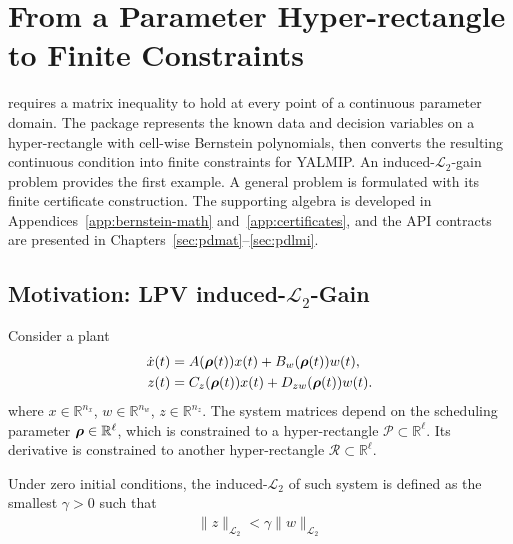 \chapter[From a Parameter Hyper-rectangle to Finite Constraints]{From a Parameter Hyper-rectangle to Finite Constraints}
\label{sec:bernstein-motivation}

 requires a matrix inequality to hold at every point of a continuous parameter domain. The package represents the known data and decision variables on a hyper-rectangle with cell-wise Bernstein polynomials, then converts the resulting continuous condition into finite constraints for YALMIP. An  induced-$\mathcal{L}_2$-gain problem provides the first example. A general  problem is formulated with its finite certificate construction. The supporting algebra is developed in Appendices~\ref{app:bernstein-math} and~\ref{app:certificates}, and the API contracts are presented in Chapters~\ref{sec:pdmat}--\ref{sec:pdlmi}.

\section[LPV Induced-L2-Gain Motivation]{Motivation: LPV induced-$\mathcal{L}_2$-Gain}

Consider a  plant
\begin{gather}
    \begin{aligned}
        \dot x(t) & =A(\boldsymbol{\rho}(t))x(t)+B_w(\boldsymbol{\rho}(t))w(t), \\
        z(t)       & =C_z(\boldsymbol{\rho}(t))x(t)+D_{zw}(\boldsymbol{\rho}(t))w(t).
    \end{aligned}
    \label{eq:lpv-l2-model}
\end{gather}
where $x\in\mathbb R^{n_x}$, $w\in\mathbb R^{n_w}$, $z\in\mathbb R^{n_z}$. The system matrices depend on the scheduling parameter $\boldsymbol{\rho}\in\mathbb R^\ell$, which is constrained to a hyper-rectangle $\mathcal P\subset\mathbb R^\ell$. Its derivative is constrained to another hyper-rectangle $\mathcal R\subset\mathbb R^\ell$.

Under zero initial conditions, the induced-$\mathcal{L}_2$ of such  system is defined as the smallest $\gamma>0$ such that
\begin{gather*}
    \lVert z\rVert_{\mathcal L_2}<\gamma\lVert w\rVert_{\mathcal L_2}
\end{gather*}

